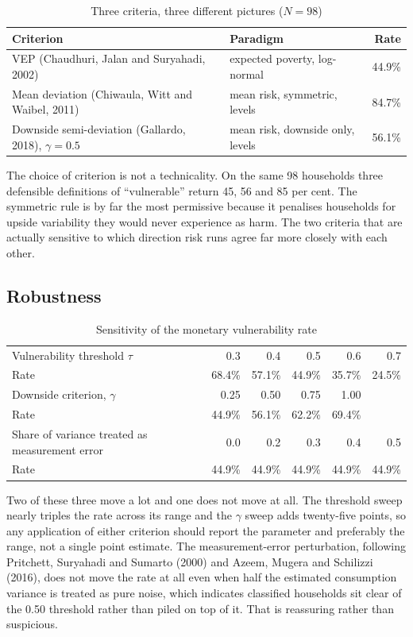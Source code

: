 \documentclass[11pt]{article}
\begin{document}
\begin{table}[h]
\centering
\caption{Three criteria, three different pictures ($N = 98$)}
\begin{tabular}{llr}
\toprule
Criterion & Paradigm & Rate \\
\midrule
VEP (Chaudhuri, Jalan and Suryahadi, 2002) & expected poverty, log-normal & 44.9\% \\
Mean deviation (Chiwaula, Witt and Waibel, 2011) & mean risk, symmetric, levels & 84.7\% \\
Downside semi-deviation (Gallardo, 2018), $\gamma = 0.5$ & mean risk, downside only, levels & 56.1\% \\
\bottomrule
\end{tabular}
\end{table}

The choice of criterion is not a technicality. On the same 98 households three defensible
definitions of ``vulnerable'' return 45, 56 and 85 per cent. The symmetric rule is by far the
most permissive because it penalises households for upside variability they would never
experience as harm. The two criteria that are actually sensitive to which direction risk runs
agree far more closely with each other.

\subsection{Robustness}\label{sec:robust}

\begin{table}[h]
\centering
\caption{Sensitivity of the monetary vulnerability rate}
\begin{tabular}{lrrrrr}
\toprule
Vulnerability threshold $\tau$ & 0.3 & 0.4 & 0.5 & 0.6 & 0.7 \\
Rate & 68.4\% & 57.1\% & 44.9\% & 35.7\% & 24.5\% \\
\midrule
Downside criterion, $\gamma$ & 0.25 & 0.50 & 0.75 & 1.00 & \\
Rate & 44.9\% & 56.1\% & 62.2\% & 69.4\% & \\
\midrule
Share of variance treated as measurement error & 0.0 & 0.2 & 0.3 & 0.4 & 0.5 \\
Rate & 44.9\% & 44.9\% & 44.9\% & 44.9\% & 44.9\% \\
\bottomrule
\end{tabular}
\end{table}

Two of these three move a lot and one does not move at all. The threshold sweep nearly triples
the rate across its range and the $\gamma$ sweep adds twenty-five points, so any application of
either criterion should report the parameter and preferably the range, not a single point
estimate. The measurement-error perturbation, following Pritchett, Suryahadi and Sumarto (2000)
and Azeem, Mugera and Schilizzi (2016), does not move the rate at all even when half the
estimated consumption variance is treated as pure noise, which indicates classified households
sit clear of the 0.50 threshold rather than piled on top of it. That is reassuring rather than
suspicious.
\end{document}
